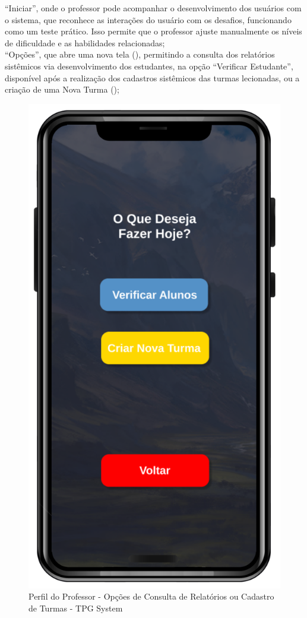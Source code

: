 “Iniciar”, onde o professor pode acompanhar o desenvolvimento dos usuários com o sistema, que reconhece as interações do usuário com os desafios, funcionando como um teste prático. Isso permite que o professor ajuste manualmente os níveis de dificuldade e as habilidades relacionadas;
\\

“Opções”, que abre uma nova tela (), permitindo a consulta dos relatórios sistêmicos via desenvolvimento dos estudantes, na opção “Verificar Estudante”, disponível após a realização dos cadastros sistêmicos das turmas lecionadas, ou a criação de uma Nova Turma ();
\\

\begin{figure}[!h]
\centering
\caption{Perfil do Professor - Opções de Consulta de Relatórios ou Cadastro de Turmas - TPG System}%
\label{fig:Tela6}
\includegraphics[scale=0.20]{Illustrations/Tela6.png}
\end{figure}

